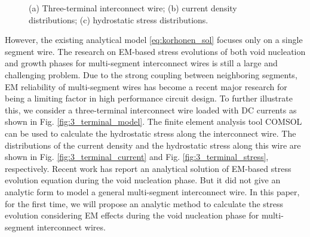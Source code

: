 \begin{figure}[ht] \centering {}
    \vspace{-0.12in}
    \vspace{-0.04in}
\caption{(a) Three-terminal interconnect wire; (b) current density distributions; (c) hydrostatic stress distributions. }
  \label{fig:3_terminal}
  \vspace{-0.12in}
\end{figure}

However, the existing analytical model \eqref{eq:korhonen_sol} focuses only on a single segment wire. The research on EM-based stress evolutions of both void nucleation and growth phases for multi-segment interconnect wires is still a large and challenging problem. Due to the strong coupling between neighboring segments, EM reliability of multi-segment wires has become a recent major research for being a limiting factor in high performance circuit design. To further illustrate this, we consider a three-terminal interconnect wire loaded with DC currents as shown in Fig. \ref{fig:3_terminal_model}. The finite element analysis tool COMSOL \cite{?} can be used to calculate the hydrostatic stress along the interconnect wire. The distributions of the current density and the hydrostatic stress along this wire are shown in Fig. \ref{fig:3_terminal_current} and Fig. \ref{fig:3_terminal_stress}, respectively. Recent work \cite{?} has report an analytical solution of EM-based stress evolution equation during the void nucleation phase. But it did not give an analytic form to model a general multi-segment interconnect wire. In this paper, for the first time, we will propose an analytic method to calculate the stress evolution considering EM effects during the void nucleation phase for multi-segment interconnect wires.






